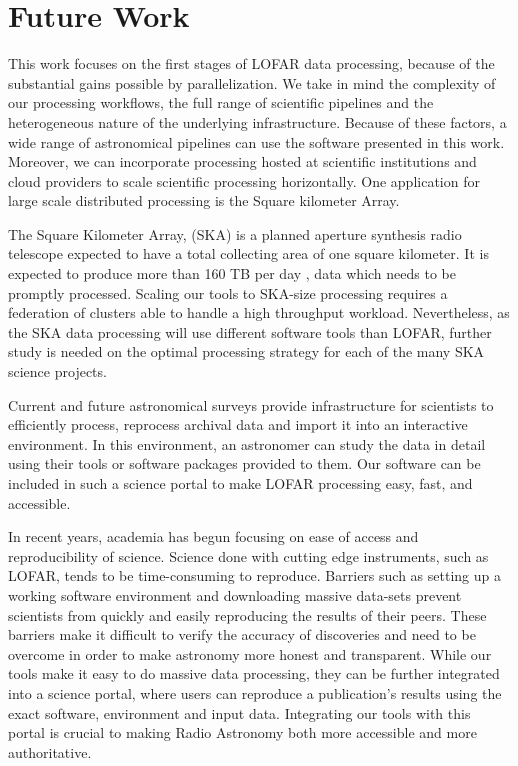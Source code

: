 \section{Future Work}

This work focuses on the first stages of LOFAR data processing, because of the substantial gains possible by parallelization. We take in mind the complexity of our processing workflows, the full range of scientific pipelines and the heterogeneous nature of the underlying infrastructure. Because of these factors, a wide range of astronomical pipelines can use the software presented in this work. Moreover, we can incorporate processing hosted at scientific institutions and cloud providers to scale scientific processing horizontally. One application for large scale distributed processing is the Square kilometer Array. 

The Square Kilometer Array, (SKA) is a planned aperture synthesis radio telescope expected to have a total collecting area of one square kilometer. It is expected to produce more than 160 TB per day \citep{johnston2017taming}, data which needs to be promptly processed. Scaling our tools to SKA-size processing requires a federation of clusters able to handle a high throughput workload. Nevertheless, as the SKA data processing will use different software tools than LOFAR, further study is needed on the optimal processing strategy for each of the many SKA science projects.

Current and future astronomical surveys provide infrastructure for scientists to efficiently process, reprocess archival data and import it into an interactive environment. In this environment, an astronomer can study the data in detail using their tools or software packages provided to them. Our software can be included in such a science portal to make LOFAR processing easy, fast, and accessible.

In recent years, academia has begun focusing on ease of access and reproducibility of science. Science done with cutting edge instruments, such as LOFAR, tends to be time-consuming to reproduce. Barriers such as setting up a working software environment and downloading massive data-sets prevent scientists from quickly and easily reproducing the results of their peers. These barriers make it difficult to verify the accuracy of discoveries and need to be overcome in order to make astronomy more honest and transparent. While our tools make it easy to do massive data processing, they can be further integrated into a science portal, where users can reproduce a publication's results using the exact software, environment and input data. Integrating our tools with this portal is crucial to making Radio Astronomy both more accessible and more authoritative.
